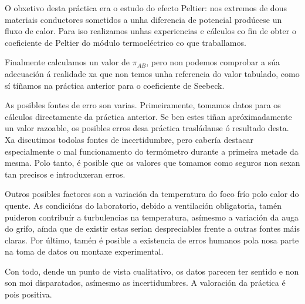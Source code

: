 \documentclass[12pt, a4paper, titlepage]{article}
\begin{document}
  O obxetivo desta práctica era o estudo do efecto Peltier: nos extremos de dous materiais conductores sometidos a unha diferencia de potencial prodúcese un fluxo de calor. Para iso realizamos unhas experiencias e cálculos co fin de obter o coeficiente de Peltier do módulo termoeléctrico co que traballamos.

  Finalmente calculamos un valor de $\pi_{AB}$, pero non podemos comprobar a súa adecuación á realidade xa que non temos unha referencia do valor tabulado, como sí tíñamos na práctica anterior para o coeficiente de Seebeck.

  As posibles fontes de erro son varias. Primeiramente, tomamos datos para os cálculos directamente da práctica anterior. Se ben estes tiñan apróximadamente un valor razoable, os posibles erros desa práctica trasládanse ó resultado desta. Xa discutimos todolas fontes de incertidumbre, pero cabería destacar especialmente o mal funcionamento do termómetro durante a primeira metade da mesma. Polo tanto, é posible que os valores que tomamos como seguros non sexan tan precisos e introduxeran erros.

  Outros posibles factores son a variación da temperatura do foco frío polo calor do quente. As condicións do laboratorio, debido a ventilación obligatoria, tamén puideron contribuír a turbulencias na temperatura, asímesmo a variación da auga do grifo, aínda que de existir estas serían despreciables frente a outras fontes máis claras. Por último, tamén é posible a existencia de erros humanos pola nosa parte na toma de datos ou montaxe experimental.

  Con todo, dende un punto de vista cualitativo, os datos parecen ter sentido e non son moi disparatados, asímesmo as incertidumbres. A valoración da práctica é pois positiva.
\end{document}
